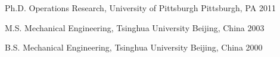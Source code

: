 
\begin{cvhonors}

  \cvhonor
    {Ph.D.}                                                     %
    {Operations Research, University of Pittsburgh}          %
    {Pittsburgh, PA}                                            %
    {2011}                                                      %

  \cvhonor
    {M.S.}    %
    {Mechanical Engineering, Tsinghua University}               %
    {Beijing, China}                    %
    {2003}                              %

  \cvhonor
    {B.S.}    %
    {Mechanical Engineering, Tsinghua University}               %
    {Beijing, China}                    %
    {2000}                              %

\end{cvhonors}

